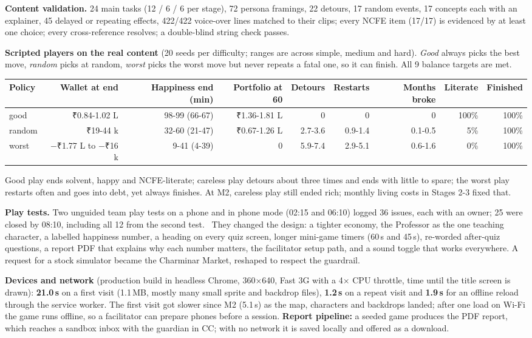 \documentclass[10pt,a4paper]{article}
\newcommand{\rs}{{\rupeefont ₹}}
\begin{document}
\textbf{Content validation.} 24 main tasks (12 / 6 / 6 per stage), 72 persona framings, 22 detours, 17 random events, 17 concepts each with an explainer, 45 delayed or repeating effects, 422/422 voice-over lines matched to their clips; every NCFE item (17/17) is evidenced by at least one choice; every cross-reference resolves; a double-blind string check passes.

\textbf{Scripted players on the real content} (20 seeds per difficulty; ranges are across simple, medium and hard). \emph{Good} always picks the best move, \emph{random} picks at random, \emph{worst} picks the worst move but never repeats a fatal one, so it can finish. All 9 balance targets are met.
\begin{center}\footnotesize
\begin{tabular}{@{}lrrrrrrrr@{}}
\toprule
Policy & Wallet at end & Happiness end (min) & Portfolio at 60 & Detours & Restarts & Months broke & Literate & Finished \\
\midrule
good & \rs0.84-1.02 L & 98-99 (66-67) & \rs1.36-1.81 L & 0 & 0 & 0 & 100\% & 100\% \\
random & \rs19-44 k & 32-60 (21-47) & \rs0.67-1.26 L & 2.7-3.6 & 0.9-1.4 & 0.1-0.5 & 5\% & 100\% \\
worst & $-$\rs1.77 L to $-$\rs16 k & 9-41 (4-39) & 0 & 5.9-7.4 & 2.9-5.1 & 0.6-1.6 & 0\% & 100\% \\
\bottomrule
\end{tabular}
\end{center}
Good play ends solvent, happy and NCFE-literate; careless play detours about three times and ends with little to spare; the worst play restarts often and goes into debt, yet always finishes. At M2, careless play still ended rich; monthly living costs in Stages 2-3 fixed that.

\textbf{Play tests.} Two unguided team play tests on a phone and in phone mode (02:15 and 06:10) logged 36 issues, each with an owner; 25 were closed by 08:10, including all 12 from the second test.%
\ They changed the design: a tighter economy, the Professor as the one teaching character, a labelled happiness number, a heading on every quiz screen, longer mini-game timers (60\,s and 45\,s), re-worded after-quiz questions, a report PDF that explains why each number matters, the facilitator setup path, and a sound toggle that works everywhere. A request for a stock simulator became the Charminar Market, reshaped to respect the guardrail.

\textbf{Devices and network} (production build in headless Chrome, 360$\times$640, Fast 3G with a 4$\times$ CPU throttle, time until the title screen is drawn): \textbf{21.0\,s} on a first visit (1.1\,MB, mostly many small sprite and backdrop files), \textbf{1.2\,s} on a repeat visit and \textbf{1.9\,s} for an offline reload through the service worker. The first visit got slower since M2 (5.1\,s) as the map, characters and backdrops landed; after one load on Wi-Fi the game runs offline, so a facilitator can prepare phones before a session.
\textbf{Report pipeline:} a seeded game produces the PDF report, which reaches a sandbox inbox with the guardian in CC; with no network it is saved locally and offered as a download.
\end{document}
